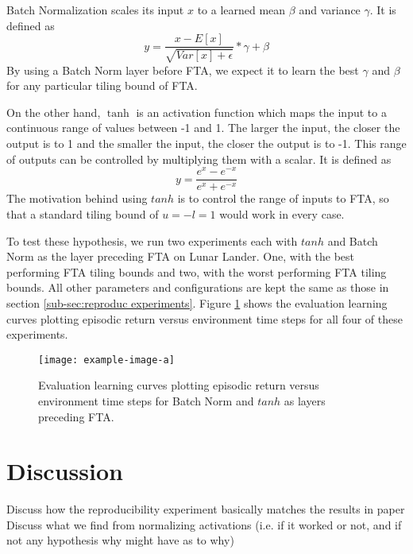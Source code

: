 \documentclass{article}
\begin{document}
Batch Normalization scales its input $x$ to a learned mean $\beta$ and variance $\gamma$. 
It is defined as 
\begin{equation}
    y = \frac{x-E[x]}{\sqrt{Var[x] + \epsilon}} * \gamma + \beta
    \label{eq:batchnorm}
\end{equation}
By using a Batch Norm layer before FTA, we expect it to learn the best $\gamma$ and $\beta$ for any particular tiling bound of FTA.

On the other hand, $\tanh$ is an activation function which maps the input to a continuous range of values between -1 and 1. 
The larger the input, the closer the output is to 1 and the smaller the input, the closer the output is to -1. 
This range of outputs can be controlled by multiplying them with a scalar. 
It is defined as 
 \begin{equation}
    y = \frac{e^x-e^{-x}}{e^x+e^{-x}}
    \label{eq:tanh}
 \end{equation}
The motivation behind using $tanh$ is to control the range of inputs to FTA, so that a standard tiling bound of $u = -l = 1$ would work in every case.

To test these hypothesis, we run two experiments each with $tanh$ and Batch Norm as the layer preceding FTA on Lunar Lander. 
One, with the best performing FTA tiling bounds and two, with the worst performing FTA tiling bounds. 
All other parameters and configurations are kept the same as those in section \ref{sub-sec:reproduc experiments}. 
Figure \ref{fig:bnvtanh} shows the evaluation learning curves plotting episodic return versus environment time steps for all four of these experiments.

\begin{figure}[h]
    \centering
    \texttt{[image: example-image-a]}
    \caption{Evaluation learning curves plotting episodic return versus environment time steps for Batch Norm and $tanh$ as layers preceding FTA.}
    \label{fig:bnvtanh}
\end{figure}


\section{Discussion} \label{sec:discussion}
Discuss how the reproducibility experiment basically matches the results in \cite[]{pan2019fuzzy} paper
Discuss what we find from normalizing activations (i.e. if it worked or not, and if not any hypothesis why might have as to why)


\newpage

\end{document}
